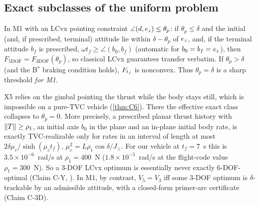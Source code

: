 \subsection{Exact subclasses of the uniform problem}
\begin{proposition}\label{prop:X5}
In M1 with an LCvx pointing constraint $\angle(d,e_z)\le\theta_p$: if $\theta_p\le\delta$ and the initial (and, if prescribed,
terminal) attitude lie within $\delta-\theta_p$ of $e_z$, and, if the terminal attitude $b_f$ is prescribed,
$\omega t_f\ge\angle(b_0,b_f)$ (automatic for $b_0=b_f=e_z$), then $F_{5\mathrm{DOF}}=F_{3\mathrm{DOF}}(\theta_p)$, so classical LCvx guarantees
transfer verbatim. If $\theta_p>\delta$ (and the B$^*$ braking condition holds), $F_{t_f}$ is nonconvex. Thus $\theta_p=\delta$ is a sharp
threshold \emph{for M1}.\Srep
\end{proposition}
X5 relies on the gimbal pointing the thrust while the body stays still, which is impossible on a pure-TVC vehicle
(\cref{thm:C6}). There the effective exact class collapses to $\theta_p=0$. More precisely, a prescribed planar thrust history
with $\lVert T\rVert\ge\rho_1$, an initial axis $b_0$ in the plane and an in-plane initial body rate, is exactly TVC-realizable only for
rates in an interval of length at most $2\delta\mu_c/\sinh(\mu_ct_f)$, $\mu_c^2=L\rho_1\cos\delta/J_\perp$. For our vehicle at $t_f=7$~s
this is $3.5\times10^{-6}$~rad/s at $\rho_1=400$~N ($1.8\times10^{-5}$~rad/s at the flight-code value $\rho_1=300$~N). So a 3-DOF
LCvx optimum is essentially never exactly 6-DOF-optimal (Claim C-Y, \Sproved). In M1, by contrast, $V_5=V_3$ iff some
3-DOF optimum is $\delta$-trackable by an admissible attitude, with a closed-form primer-arc certificate (Claim C-3D)\Spending.

